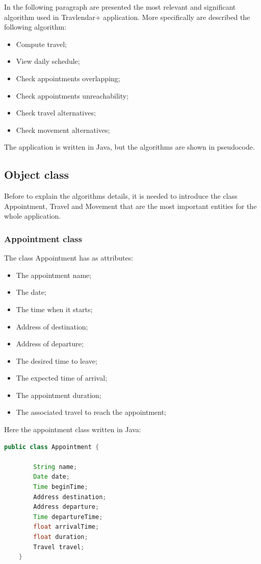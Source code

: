 In the following paragraph are presented the most relevant and significant algorithm used in Travlendar+ application.
More specifically are described the following algorithm:
\begin{itemize}
	\item Compute travel;
	\item View daily schedule;
	\item Check appointments overlapping;
	\item Check appointments unreachability;
	\item Check travel alternatives;
	\item Check movement alternatives;
\end{itemize}

The application is written in Java, but the algorithms are shown in pseudocode.

\subsection{Object class}

Before to explain the algorithms details, it is needed to introduce the class Appointment, Travel and Movement that are the most important entities for the whole application.

\subsubsection{Appointment class}

The class Appointment has as attributes:
\begin{itemize}
	\item The appointment name;
	\item The date;
	\item The time when it starts;
	\item Address of destination;
	\item Address of departure;
	\item The desired time to leave;
	\item The expected time of arrival;
	\item The appointment duration;
	\item The associated travel to reach the appointment;
\end{itemize}

Here the appointment class written in Java:
\begin{lstlisting}[language=Java]
	public class Appointment {
	
		String name;
		Date date;
		Time beginTime;
		Address destination;
		Address departure;
		Time departureTime;
		float arrivalTime;
		float duration;
		Travel travel;
	}
		
\end{lstlisting}

